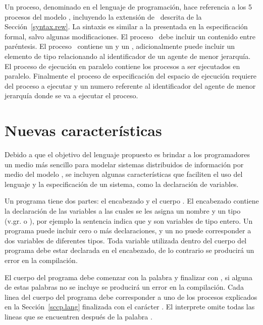 Un proceso, denominado  en el lenguaje de programaci\'on, hace referencia a los 5 procesos del modelo \SCCP, incluyendo la extensi\'on de \ask \ descrita de la Secci\'on~\ref{syntax.rew}. La sintaxis es similar a la presentada en la especificaci\'on formal, salvo algunas modificaciones. El proceso \tell \ debe incluir un  contenido entre par\'entesis. El proceso \ask \ contiene un  y un , adicionalmente puede incluir un elemento de tipo  relacionando al identificador de un agente de menor jerarqu\'ia. El proceso de ejecuci\'on en paralelo contiene los procesos a ser ejecutados en paralelo. Finalmente el proceso de especificaci\'on del espacio de ejecuci\'on requiere del proceso a ejecutar  y un numero  referente al identificador del agente de menor jerarqu\'ia donde se va a ejecutar el proceso.

\section{Nuevas caracter\'isticas}
\label{new.lang}

Debido a que el objetivo del lenguaje propuesto es brindar a los programadores un medio m\'as sencillo para modelar sistemas distribuidos de informaci\'on por medio del modelo \SCCP, se incluyen algunas caracter\'isticas que faciliten el uso del lenguaje y la especificaci\'on de un sistema, como la declaraci\'on de variables.

Un programa  tiene dos partes: el encabezado  y el cuerpo . El encabezado contiene la declaraci\'on de las variables a las cuales se les asigna un nombre  y un tipo (v.gr.  o ), por ejemplo la sentencia  indica que  y  son variables de tipo entero. Un programa puede incluir cero o m\'as declaraciones, y un  no puede corresponder a dos variables de diferentes tipos. Toda variable utilizada dentro del cuerpo del programa debe estar declarada en el encabezado, de lo contrario se producir\'a un error en la compilaci\'on.  

El cuerpo del programa debe comenzar con la palabra  y finalizar con , si alguna de estas palabras no se incluye se producir\'a un error en la compilaci\'on. Cada linea del cuerpo del programa debe corresponder a uno de los procesos explicados en la Secci\'on~\ref{sccp.lang} finalizada con el car\'acter . El interprete omite todas las lineas que se encuentren despu\'es de la palabra .

